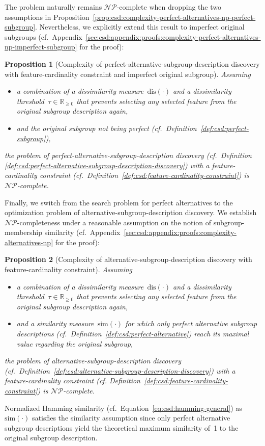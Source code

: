 \documentclass{article}
\newtheorem{proposition}{Proposition}
\theoremstyle{definition}
\begin{document}
The problem naturally remains $\mathcal{NP}$-complete when dropping the two assumptions in Proposition~\ref{prop:csd:complexity-perfect-alternatives-np-perfect-subgroup}.
Nevertheless, we explicitly extend this result to imperfect original subgroups (cf.~Appendix~\ref{sec:csd:appendix:proofs:complexity-perfect-alternatives-np-imperfect-subgroup} for the proof):
%
\begin{proposition}[Complexity of perfect-alternative-subgroup-description discovery with feature-cardinality constraint and imperfect original subgroup]
	Assuming
	\begin{itemize}[noitemsep]
		\item a combination of a dissimilarity measure~$\text{dis}(\cdot)$ and a dissimilarity threshold~$\tau \in \mathbb{R}_{\geq 0}$ that prevents selecting any selected feature from the original subgroup description again,
		\item and the original subgroup \emph{not} being perfect (cf.~Definition~\ref{def:csd:perfect-subgroup}),
	\end{itemize}
	the problem of perfect-alternative-subgroup-description discovery (cf.~Definition \ref{def:csd:perfect-alternative-subgroup-description-discovery}) with a feature-cardinality constraint (cf.~Definition~\ref{def:csd:feature-cardinality-constraint}) is $\mathcal{NP}$-complete.
	\label{prop:csd:complexity-perfect-alternatives-np-imperfect-subgroup}
\end{proposition}
%
Finally, we switch from the search problem for perfect alternatives to the optimization problem of alternative-subgroup-description discovery.
We establish $\mathcal{NP}$-completeness under a reasonable assumption on the notion of subgroup-membership similarity (cf.~Appendix~\ref{sec:csd:appendix:proofs:complexity-alternatives-np} for the proof):
%
\begin{proposition}[Complexity of alternative-subgroup-description discovery with feature-cardinality constraint]
	Assuming
	\begin{itemize}[noitemsep]
		\item a combination of a dissimilarity measure~$\text{dis}(\cdot)$ and a dissimilarity threshold~$\tau \in \mathbb{R}_{\geq 0}$ that prevents selecting any selected feature from the original subgroup description again,
		\item and a similarity measure~$\text{sim}(\cdot)$ for which only perfect alternative subgroup descriptions (cf.~Definition~\ref{def:csd:perfect-alternative}) reach its maximal value regarding the original subgroup,
	\end{itemize}
	the problem of alternative-subgroup-description discovery (cf.~Definition~\ref{def:csd:alternative-subgroup-description-discovery}) with a feature-cardinality constraint (cf. Definition~\ref{def:csd:feature-cardinality-constraint}) is $\mathcal{NP}$-complete.
	\label{prop:csd:complexity-alternatives-np}
\end{proposition}
%
Normalized Hamming similarity (cf.~Equation~\ref{eq:csd:hamming-general}) as~$\text{sim}(\cdot)$ satisfies the similarity assumption since only perfect alternative subgroup descriptions yield the theoretical maximum similarity of~1 to the original subgroup description.
\end{document}
